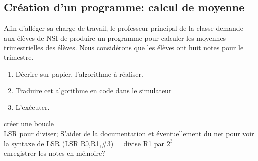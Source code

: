 \documentclass[a4paper,11pt]{article}
\begin{document}
\begin{Form}
\section{Création d'un programme: calcul de moyenne}
Afin d'alléger sa charge de travail, le professeur principal de la classe demande aux élèves de NSI de produire un programme pour calculer les moyennes trimestrielles des élèves. Nous considérons que les élèves ont huit notes pour le trimestre.
\begin{activite}
\begin{enumerate}
\item Décrire sur papier, l'algorithme à réaliser.
\item Traduire cet algorithme en code dans le simulateur.
\item L'exécuter.
\end{enumerate}
\end{activite}
\begin{commentprof}
\noindent créer une boucle\\LSR pour diviser; S'aider de la documentation et éventuellement du net pour voir la syntaxe de LSR (LSR R0,R1,\#3) = divise R1 par $2^3$\\enregistrer les notes en mémoire?
\end{commentprof}
\end{Form}
\end{document}
